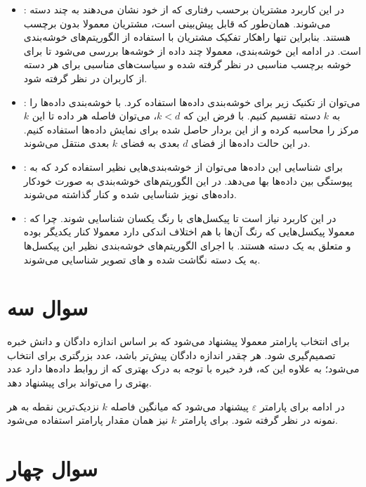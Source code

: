 \documentclass[12pt, a4paper]{article}
\begin{document}
\begin{itemize}
    \item {}: در این کاربرد مشتریان برحسب رفتاری که از خود نشان می‌دهند به چند
    دسته می‌شوند. همان‌طور که قابل پیش‌بینی است، مشتریان معمولا بدون برچسب هستند. بنابراین تنها راهکار تفکیک
    مشتریان با استفاده از الگوریتم‌های خوشه‌بندی است. در ادامه این خوشه‌بندی، معمولا چند داده از
    خوشه‌ها بررسی می‌شود تا برای خوشه برچسب مناسبی در نظر گرفته شده و سیاست‌های مناسبی برای هر دسته از کاربران در
    نظر گرفته شود.
    \item {}: می‌توان از تکنیک زیر برای خوشه‌بندی داده‌ها استفاده کرد.
    با خوشه‌بندی داده‌ها را به $k$ دسته تقسیم کنیم. با فرض این که $k<d$، می‌توان فاصله هر داده تا این
    $k$ مرکز را محاسبه کرده و از این بردار حاصل شده برای نمایش داده‌ها استفاده کنیم. در این حالت داده‌ها از
    فضای $d$ بعدی به فضای $k$ بعدی منتقل می‌شوند.
    \item {}: برای شناسایی این داده‌ها می‌توان از خوشه‌بندی‌هایی نظیر  استفاده کرد
    که به پیوستگی بین داده‌ها بها می‌دهد. در این الگوریتم‌های خوشه‌بندی به صورت خودکار داده‌های نویز شناسایی شده
    و کنار گذاشته می‌شوند.
    \item {}: در این کاربرد نیاز است تا پیکسل‌های با رنگ یکسان شناسایی شوند. چرا که
    معمولا پیکسل‌هایی که رنگ آن‌ها با هم اختلاف اندکی دارد معمولا کنار یکدیگر بوده و متعلق به یک دسته هستند.
    با اجرای الگوریتم‌های خوشه‌بندی نظیر  این پیکسل‌ها به یک دسته نگاشت شده و ‌های
    تصویر شناسایی می‌شوند.
\end{itemize}

\section*{سوال سه}

برای انتخاب پارامتر  معمولا پیشنهاد می‌شود که بر اساس اندازه دادگان و دانش خبره تصمیم‌گیری شود.
هر چقدر اندازه دادگان پیش‌تر باشد، عدد بزرگتری برای  انتخاب می‌شود؛ به علاوه این که، فرد خبره
با توجه به درک بهتری که از روابط داده‌ها دارد عدد بهتری را می‌تواند برای  پیشنهاد دهد.

در ادامه برای پارامتر $\varepsilon$ پیشنهاد می‌شود که میانگین فاصله $k$ نزدیک‌ترین نقطه به هر نمونه
در نظر گرفته شود. برای پارامتر $k$ نیز همان مقدار پارامتر  استفاده می‌شود.

\section*{سوال چهار}
\end{document}
